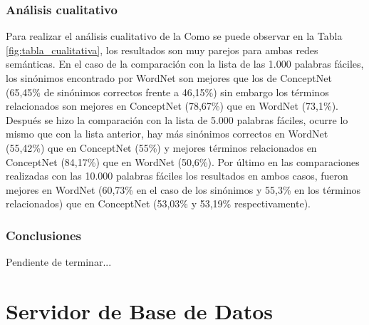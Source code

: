 \subsubsection{Análisis cualitativo}
\label{sssec:pruebaCualitativa}
Para realizar el análisis cualitativo de la
Como se puede observar en la Tabla \ref{fig:tabla_cualitativa}, los resultados son muy parejos para ambas redes semánticas. En el caso de la comparación con la lista de las 1.000 palabras fáciles, los sinónimos encontrado por WordNet son mejores que los de ConceptNet (65,45\% de sinónimos correctos frente a 46,15\%) sin embargo los términos relacionados son mejores en ConceptNet (78,67\%) que en WordNet (73,1\%). Después se hizo la comparación con la lista de 5.000 palabras fáciles, ocurre lo mismo que con la lista anterior, hay más sinónimos correctos en WordNet (55,42\%) que en ConceptNet (55\%) y mejores términos relacionados en ConceptNet (84,17\%) que en WordNet (50,6\%). Por último en las comparaciones realizadas con las 10.000 palabras fáciles los resultados en ambos casos, fueron mejores en WordNet (60,73\% en el caso de los sinónimos y 55,3\% en los términos relacionados) que en ConceptNet (53,03\% y 53,19\% respectivamente).


\subsubsection{Conclusiones}
\label{sssec:conclusionPruebas}

Pendiente de terminar...

\section{Servidor de Base de Datos}

